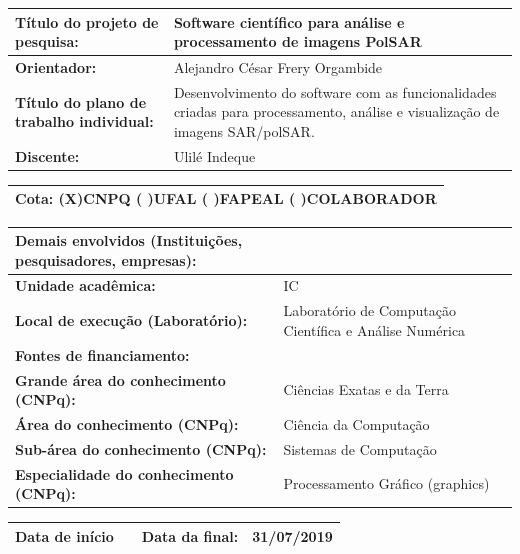 \documentclass[a4paper,12pt]{article}
\begin{document}
    \begin{table}[h]
        \centering
        \begin{tabular}{|p{}|p{}|} \hline 
             \textbf{Título do projeto de pesquisa: }& Software científico para análise e processamento de imagens PolSAR \\ 
             \hline
             \textbf{Orientador: }& Alejandro César Frery Orgambide  \\  
             \hline
             \textbf{Título do plano de trabalho individual:} & Desenvolvimento do software com as funcionalidades criadas para processamento, análise e visualização de imagens SAR/polSAR. \\ 
             \hline
             \textbf{Discente:} & Ulilé Indeque\\ 
             \hline
             \end{tabular}
             \begin{tabular}{|p{}|}
             \textbf{Cota: (X)CNPQ ( )UFAL ( )FAPEAL ( )COLABORADOR} \\ 
             \hline
        \end{tabular}
        \begin{tabular}{|p{}|p{}|}
            \textbf{Demais envolvidos (Instituições, pesquisadores, empresas):} & \\ \hline
             \textbf{Unidade acadêmica:} &  IC\\
            \hline
            \textbf{Local de execução (Laboratório):} &  Laboratório de Computação Científica e Análise Numérica\\
            \hline
            \textbf{Fontes de financiamento:} & \\ 
            \hline
            \textbf{Grande área do conhecimento (CNPq):} &  Ciências Exatas e da Terra\\
            \hline
            \textbf{Área do conhecimento (CNPq):} &  Ciência da Computação\\
            \hline
            \textbf{Sub-área do conhecimento (CNPq):} &  Sistemas de Computação\\
            \hline
            \textbf{Especialidade do conhecimento (CNPq):} &  Processamento Gráfico (graphics)\\
            \hline
        \end{tabular}
        \begin{tabular}{|p{}|p{3cm}|p{5cm}|p{}|}
          \textbf{Data de início} & \centering{\textbf{01/08/2018}}  & \textbf{Data da final:} & \textbf{31/07/2019}\\
        \hline
        \end{tabular}
    \end{table}
\end{document}
